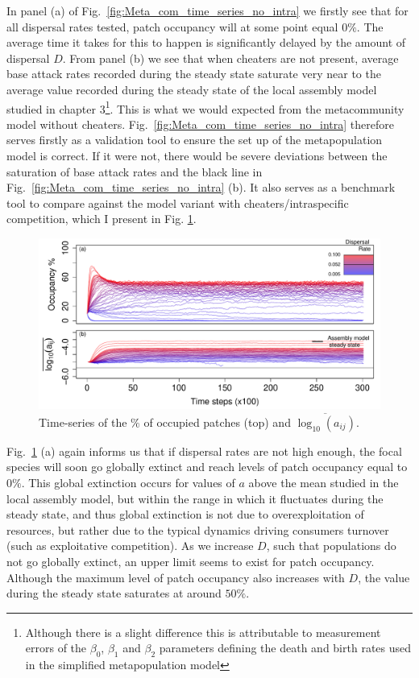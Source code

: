 \documentclass[a4paper]{report}
\DeclareMathOperator{\log}{log}
\begin{document}
 In panel (a) of Fig.~\ref{fig:Meta_com_time_series_no_intra} we firstly see that for all dispersal rates tested, patch occupancy will at some point equal 0$\%$. The average time it takes for this to happen is significantly delayed by the amount of dispersal $D$. From panel (b) we see that when cheaters are not present, average base attack rates recorded during the steady state saturate very near to the average value recorded during the steady state of the local assembly model studied in chapter 3\footnote{Although there is a slight difference this is attributable to measurement errors of the $\beta_0$, $\beta_1$ and $\beta_2$ parameters defining the death and birth rates used in the simplified metapopulation model}. This is what we would expected from the metacommunity model without cheaters. Fig.~\ref{fig:Meta_com_time_series_no_intra} therefore serves firstly as a validation tool to ensure the set up of the metapopulation model is correct. If it were not, there would be severe deviations between the saturation of base attack rates and the black line in Fig.~\ref{fig:Meta_com_time_series_no_intra} (b). It also serves as a benchmark tool to compare against the model variant with cheaters/intraspecific competition, which I present in Fig. \ref{fig:Meta_com_time_series_2}.
 
\begin{figure}[H]
\centering{}
\includegraphics[scale=0.7]{../Images/Meta_com_time_series_2.pdf}
\caption{Time-series of the $\%$ of occupied patches (top) and $\overline{\log_{10}(a_{ij})}$. \label{fig:Meta_com_time_series_2}}
\end{figure}

Fig.~\ref{fig:Meta_com_time_series_2} (a) again informs us that if dispersal rates are not high enough, the focal species will soon go globally extinct and reach levels of patch occupancy equal to $0\%$. This global extinction occurs for values of $a$ above the mean studied in the local assembly model, but within the range in which it fluctuates during the steady state, and thus global extinction is not due to overexploitation of resources, but rather due to the typical dynamics driving consumers turnover (such as exploitative competition). As we increase $D$, such that populations do not go globally extinct, an upper limit seems to exist for patch occupancy.  Although the maximum level of patch occupancy also increases with $D$, the value during the steady state saturates at around $50\%$.\\
\end{document}
